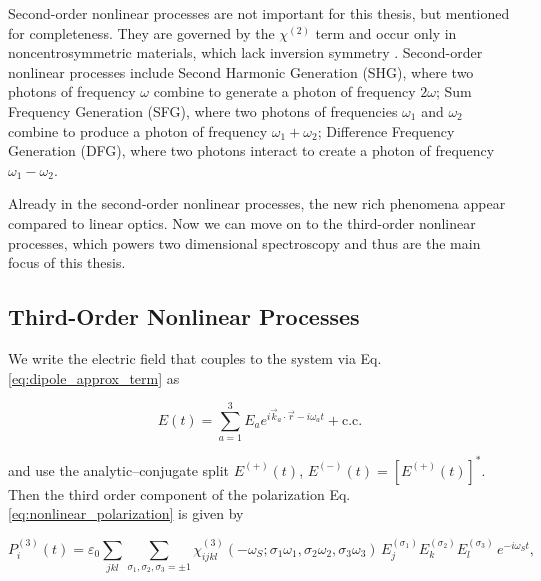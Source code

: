 \noindent 
{}
Second-order nonlinear processes are not important for this thesis, but mentioned for completeness.
They are governed by the $\chi^{(2)}$ term and occur only in noncentrosymmetric materials, which lack inversion symmetry \cite{rao2018overviewsecondthird,boyd2008chapter1nonlinear}.  Second-order nonlinear processes include Second Harmonic Generation (SHG), where two photons of frequency $\omega$ combine to generate a photon of frequency $2\omega$; Sum Frequency Generation (SFG), where two photons of frequencies $\omega_1$ and $\omega_2$ combine to produce a photon of frequency $\omega_1 + \omega_2$; Difference Frequency Generation (DFG), where two photons interact to create a photon of frequency $\omega_1 - \omega_2$.

\noindent
Already in the second-order nonlinear processes, the new rich phenomena appear compared to linear optics.
Now we can move on to the third-order nonlinear processes, which powers two dimensional spectroscopy and thus are the main focus of this thesis.



\subsection{Third-Order Nonlinear Processes}
\label{subsec:third_order}
\noindent
We write the electric field that couples to the system via Eq. \eqref{eq:dipole_approx_term} as 

\begin{equation} \label{eq:electric_field_three_pulses}
E(t)=\sum_{a=1}^3 E_a e^{i \vec{k}_a \cdot \vec{r} - i\omega_a t} + \text{c.c.}
\end{equation}

\noindent
and use the analytic–conjugate split $E^{(+)}(t)$, $E^{(-)}(t)=[E^{(+)}(t)]^*$. Then the third order component of the polarization Eq. \eqref{eq:nonlinear_polarization} is given by

\begin{equation}
P_i^{(3)}(t)
=\varepsilon_0 \sum_{jkl}\sum_{\sigma_1,\sigma_2,\sigma_3=\pm 1}
\chi^{(3)}_{ijkl}(-\omega_S;\sigma_1\omega_1,\sigma_2\omega_2,\sigma_3\omega_3)\,
E_j^{(\sigma_1)}E_k^{(\sigma_2)}E_l^{(\sigma_3)}\,e^{-i\omega_S t},
\end{equation}


